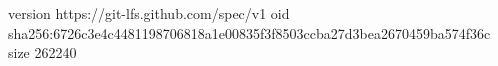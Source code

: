 version https://git-lfs.github.com/spec/v1
oid sha256:6726c3e4c4481198706818a1e00835f3f8503ccba27d3bea2670459ba574f36c
size 262240
